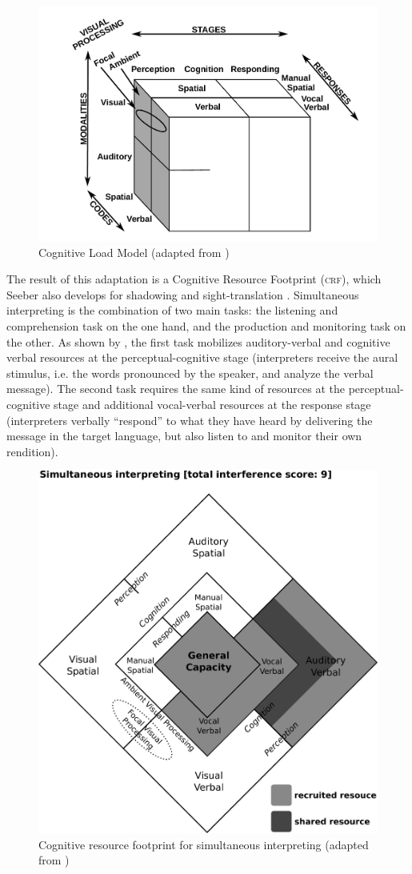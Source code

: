 \documentclass[output=paper]{langsci/langscibook}
\begin{document}
\begin{figure}
	\includegraphics[width=.7\textwidth]{figures/wickenstiescube.pdf}
\caption{Cognitive Load Model (adapted from \citealt[163]{Wickens2002})\label{fig:prandi:1}}
\end{figure}

The result of this adaptation is a Cognitive Resource Footprint (\textsc{crf}), which Seeber also develops for shadowing and sight-translation \citep{Seeber2007}. Simultaneous interpreting is the combination of two main tasks: the listening and comprehension task on the one hand, and the production and monitoring task on the other. As shown by , the first task mobilizes auditory-verbal and cognitive verbal resources at the perceptual-cognitive stage (interpreters receive the aural stimulus, i.e. the words pronounced by the speaker, and analyze the verbal message). The second task requires the same kind of resources at the perceptual-cognitive stage and additional vocal-verbal resources at the response stage (interpreters verbally ``respond'' to what they have heard by delivering the message in the target language, but also listen to and monitor their own rendition).

\begin{figure}
	\includegraphics[width=.6\textwidth]{figures/Seeberlozenge.pdf}
	\caption{\label{fig:prandi:2}Cognitive resource footprint for simultaneous interpreting (adapted from \citealt[188]{Seeber2011a})}
\end{figure}
 
\end{document}
